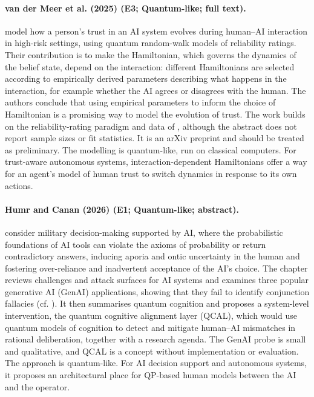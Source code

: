 \documentclass[10pt,a4paper]{article}
\begin{document}
\paragraph{van der Meer et al. (2025) (E3; Quantum-like; full text).} \citet{vanderMeer2025} model how a person's trust in an AI system evolves during human--AI interaction in high-risk settings, using quantum random-walk models of reliability ratings. Their contribution is to make the Hamiltonian, which governs the dynamics of the belief state, depend on the interaction: different Hamiltonians are selected according to empirically derived parameters describing what happens in the interaction, for example whether the AI agrees or disagrees with the human. The authors conclude that using empirical parameters to inform the choice of Hamiltonian is a promising way to model the evolution of trust. The work builds on the reliability-rating paradigm and data of \citep{Roeder2023}, although the abstract does not report sample sizes or fit statistics. It is an arXiv preprint and should be treated as preliminary. The modelling is quantum-like, run on classical computers. For trust-aware autonomous systems, interaction-dependent Hamiltonians offer a way for an agent's model of human trust to switch dynamics in response to its own actions.

\paragraph{Humr and Canan (2026) (E1; Quantum-like; abstract).} \citet{Humr2026} consider military decision-making supported by AI, where the probabilistic foundations of AI tools can violate the axioms of probability or return contradictory answers, inducing aporia and ontic uncertainty in the human and fostering over-reliance and inadvertent acceptance of the AI's choice. The chapter reviews challenges and attack surfaces for AI systems and examines three popular generative AI (GenAI) applications, showing that they fail to identify conjunction fallacies (cf. \citet{Tversky1983}). It then summarises quantum cognition and proposes a system-level intervention, the quantum cognitive alignment layer (QCAL), which would use quantum models of cognition to detect and mitigate human--AI mismatches in rational deliberation, together with a research agenda. The GenAI probe is small and qualitative, and QCAL is a concept without implementation or evaluation. The approach is quantum-like. For AI decision support and autonomous systems, it proposes an architectural place for QP-based human models between the AI and the operator.
\end{document}
